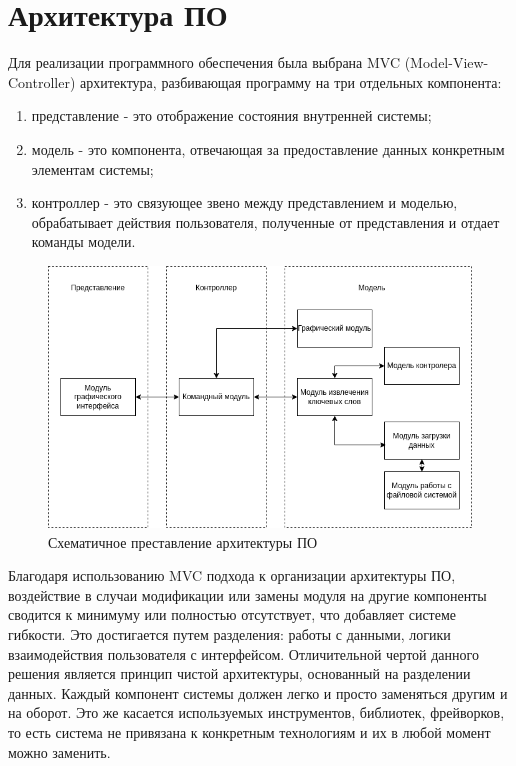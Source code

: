 \section{Архитектура ПО}
Для реализации программного обеспечения была выбрана MVC (Model-View-Controller) архитектура, разбивающая программу на три отдельных компонента:
\begin{enumerate}
	\item представление - это отображение состояния внутренней системы;
	\item модель - это компонента, отвечающая за предоставление данных конкретным элементам системы;
	\item контроллер - это связующее звено между представлением и моделью, обрабатывает действия пользователя, полученные от представления и отдает команды модели.
\end{enumerate}
\begin{figure}[!h]
	\centering
	\includegraphics[width=0.9\linewidth]{src/img/design/mvc.drawio}
	\caption{Схематичное преставление архитектуры ПО}
	\label{fig:mvc}
\end{figure}

Благодаря использованию MVC подхода к организации архитектуры ПО, воздействие в случаи модификации или замены модуля на другие компоненты сводится к минимуму или полностью отсутствует, что добавляет системе гибкости.
Это достигается путем разделения: работы с данными, логики взаимодействия пользователя с интерфейсом.
Отличительной чертой данного решения является принцип чистой архитектуры, основанный на разделении данных.
Каждый компонент системы должен легко и просто заменяться другим и на оборот.
Это же касается используемых инструментов, библиотек, фрейворков, то есть система не привязана к конкретным технологиям и их в любой момент можно заменить.

